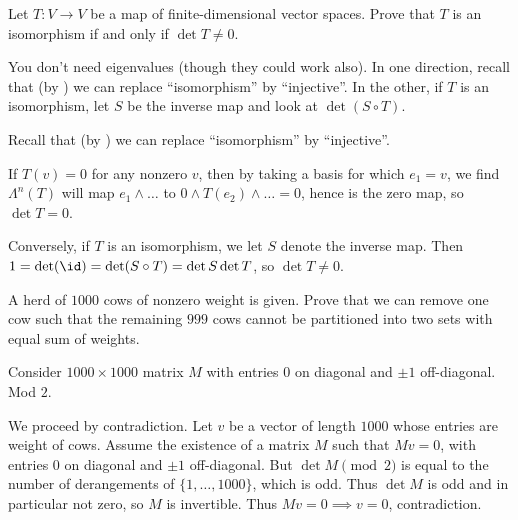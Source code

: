 \begin{problem}
	Let $T \colon V \to V$ be a map of finite-dimensional vector spaces.
	Prove that $T$ is an isomorphism
	if and only if $\det T \neq 0$.
	\begin{hint}
		You don't need eigenvalues (though they could work also).
		In one direction, recall that (by )
		we can replace ``isomorphism'' by ``injective''.
		In the other, if $T$ is an isomorphism,
		let $S$ be the inverse map and look at $\det(S \circ T)$.
	\end{hint}
	\begin{sol}
		Recall that (by \Cref{prob:equal_dimension})
		we can replace ``isomorphism'' by ``injective''.

		If $T(v) = 0$ for any nonzero $v$,
		then by taking a basis for which $e_1 = v$,
		we find $\Lambda^n(T)$ will map $e_1 \wedge \dots$
		to $0 \wedge T(e_2) \wedge \dots = 0$,
		hence is the zero map, so $\det T = 0$.

		Conversely, if $T$ is an isomorphism,
		we let $S$ denote the inverse map.
		Then $1 = \det(\id) = \det(S \circ T) = \det S \det T$,
		so $\det T \neq 0$.
	\end{sol}
\end{problem}

\begin{problem}
	\gim
	A herd of $1000$ cows of nonzero weight is given.
	Prove that we can remove one cow such that the remaining $999$ cows
	cannot be partitioned into two sets with equal sum of weights.
	\begin{hint}
		Consider $1000 \times 1000$ matrix $M$
		with entries $0$ on diagonal and $\pm 1$ off-diagonal.
		Mod $2$.
	\end{hint}
	\begin{sol}
		We proceed by contradiction.
		Let $v$ be a vector of length $1000$
		whose entries are weight of cows.
		Assume the existence of a matrix $M$ such that $Mv = 0$,
		with entries $0$ on diagonal and $\pm 1$ off-diagonal.
		But $\det M \pmod 2$ is equal to the number of derangements
		of $\{1, \dots, 1000\}$, which is odd.
		Thus $\det M$ is odd and in particular not zero,
		so $M$ is invertible.
		Thus $Mv = 0 \implies v = 0$, contradiction.
	\end{sol}
\end{problem}

